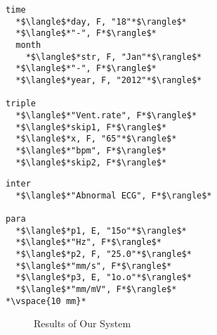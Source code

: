 

  


\newsavebox{\prflisting}
\begin{lrbox}{\prflisting}%
\begin{lstlisting}
time
  *$\langle$*day, F, "18"*$\rangle$*
  *$\langle$*"-", F*$\rangle$*
  month
    *$\langle$*str, F, "Jan"*$\rangle$*
  *$\langle$*"-", F*$\rangle$*
  *$\langle$*year, F, "2012"*$\rangle$*

triple
  *$\langle$*"Vent.rate", F*$\rangle$*
  *$\langle$*skip1, F*$\rangle$*
  *$\langle$*x, F, "65"*$\rangle$*
  *$\langle$*"bpm", F*$\rangle$*
  *$\langle$*skip2, F*$\rangle$*
\end{lstlisting}
\end{lrbox}

\newsavebox{\prslisting}
\begin{lrbox}{\prslisting}%
\begin{lstlisting}
inter
  *$\langle$*"Abnormal ECG", F*$\rangle$*

para
  *$\langle$*p1, E, "15o"*$\rangle$*
  *$\langle$*"Hz", F*$\rangle$*
  *$\langle$*p2, F, "25.0"*$\rangle$*
  *$\langle$*"mm/s", F*$\rangle$*
  *$\langle$*p3, E, "1o.o"*$\rangle$*
  *$\langle$*"mm/mV", F*$\rangle$*
*\vspace{10 mm}*
\end{lstlisting}
\end{lrbox}

\begin{figure}[h]
\subfloat{
\scalebox{1}{\usebox{\prflisting}}} 
\hspace{7 mm}
\subfloat{
\scalebox{1}{\usebox{\prslisting}}}
\caption{Results of Our System}
\label{fig:parseresult}
\end{figure}

